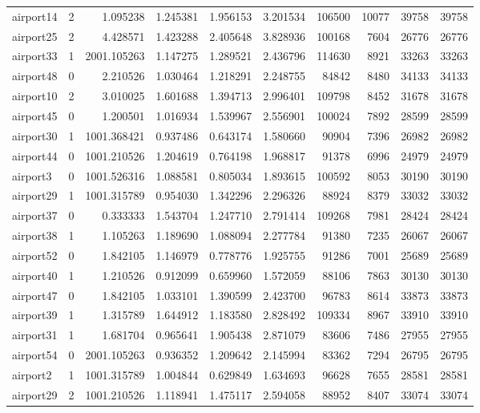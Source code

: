 \begin{longtable}{|l|r|r|r|r|r|r|r|r|r|}
airport14 & 2 & 1.095238 & 1.245381 & 1.956153 & 3.201534 & 106500 & 10077 & 39758 & 39758 \\
airport25 & 2 & 4.428571 & 1.423288 & 2.405648 & 3.828936 & 100168 & 7604 & 26776 & 26776 \\
airport33 & 1 & 2001.105263 & 1.147275 & 1.289521 & 2.436796 & 114630 & 8921 & 33263 & 33263 \\
airport48 & 0 & 2.210526 & 1.030464 & 1.218291 & 2.248755 & 84842 & 8480 & 34133 & 34133 \\
airport10 & 2 & 3.010025 & 1.601688 & 1.394713 & 2.996401 & 109798 & 8452 & 31678 & 31678 \\
airport45 & 0 & 1.200501 & 1.016934 & 1.539967 & 2.556901 & 100024 & 7892 & 28599 & 28599 \\
airport30 & 1 & 1001.368421 & 0.937486 & 0.643174 & 1.580660 & 90904 & 7396 & 26982 & 26982 \\
airport44 & 0 & 1001.210526 & 1.204619 & 0.764198 & 1.968817 & 91378 & 6996 & 24979 & 24979 \\
airport3 & 0 & 1001.526316 & 1.088581 & 0.805034 & 1.893615 & 100592 & 8053 & 30190 & 30190 \\
airport29 & 1 & 1001.315789 & 0.954030 & 1.342296 & 2.296326 & 88924 & 8379 & 33032 & 33032 \\
airport37 & 0 & 0.333333 & 1.543704 & 1.247710 & 2.791414 & 109268 & 7981 & 28424 & 28424 \\
airport38 & 1 & 1.105263 & 1.189690 & 1.088094 & 2.277784 & 91380 & 7235 & 26067 & 26067 \\
airport52 & 0 & 1.842105 & 1.146979 & 0.778776 & 1.925755 & 91286 & 7001 & 25689 & 25689 \\
airport40 & 1 & 1.210526 & 0.912099 & 0.659960 & 1.572059 & 88106 & 7863 & 30130 & 30130 \\
airport47 & 0 & 1.842105 & 1.033101 & 1.390599 & 2.423700 & 96783 & 8614 & 33873 & 33873 \\
airport39 & 1 & 1.315789 & 1.644912 & 1.183580 & 2.828492 & 109334 & 8967 & 33910 & 33910 \\
airport31 & 1 & 1.681704 & 0.965641 & 1.905438 & 2.871079 & 83606 & 7486 & 27955 & 27955 \\
airport54 & 0 & 2001.105263 & 0.936352 & 1.209642 & 2.145994 & 83362 & 7294 & 26795 & 26795 \\
airport2 & 1 & 1001.315789 & 1.004844 & 0.629849 & 1.634693 & 96628 & 7655 & 28581 & 28581 \\
airport29 & 2 & 1001.210526 & 1.118941 & 1.475117 & 2.594058 & 88952 & 8407 & 33074 & 33074 \\

\end{longtable}
